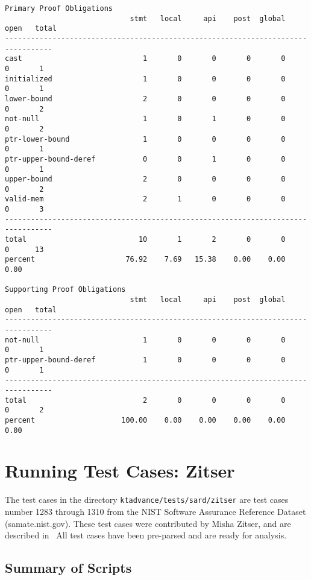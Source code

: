 \documentclass[11pt]{article}
\begin{document}
\begin{scriptsize}
\begin{verbatim}
Primary Proof Obligations
                             stmt   local     api    post  global    open   total
---------------------------------------------------------------------------------
cast                            1       0       0       0       0       0       1
initialized                     1       0       0       0       0       0       1
lower-bound                     2       0       0       0       0       0       2
not-null                        1       0       1       0       0       0       2
ptr-lower-bound                 1       0       0       0       0       0       1
ptr-upper-bound-deref           0       0       1       0       0       0       1
upper-bound                     2       0       0       0       0       0       2
valid-mem                       2       1       0       0       0       0       3
---------------------------------------------------------------------------------
total                          10       1       2       0       0       0      13
percent                     76.92    7.69   15.38    0.00    0.00    0.00

Supporting Proof Obligations
                             stmt   local     api    post  global    open   total
---------------------------------------------------------------------------------
not-null                        1       0       0       0       0       0       1
ptr-upper-bound-deref           1       0       0       0       0       0       1
---------------------------------------------------------------------------------
total                           2       0       0       0       0       0       2
percent                    100.00    0.00    0.00    0.00    0.00    0.00
\end{verbatim}
\end{scriptsize}

\section{Running Test Cases: Zitser}

The test cases in the directory {\tt ktadvance/tests/sard/zitser} 
are test cases number 1283 through 1310 from the NIST Software Assurance Reference Dataset
(samate.nist.gov). These test cases were contributed by Misha Zitser, and are described 
in~\cite{DBLP:conf/sigsoft/ZitserLL04}
All test cases have been pre-parsed and are ready for analysis.

\subsection{Summary of Scripts}
\end{document}
